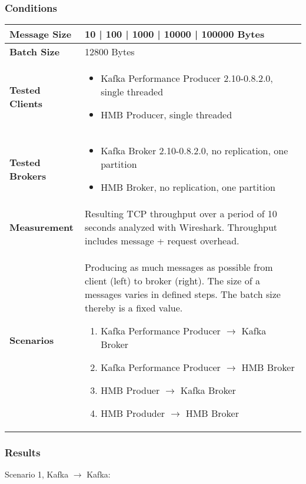 \subsubsection{Conditions}
\begin{table}[H]
\begin{tabular}{|l| p{11.5cm}|} \hline
{\bf Message Size}   & 10 | 100 | 1000 | 10000 | 100000 Bytes \\ \hline
{\bf Batch Size}     & 12800 Bytes \\ \hline
{\bf Tested Clients} &
    \begin{itemize}
        \item Kafka Performance Producer 2.10-0.8.2.0, single threaded
        \item HMB Producer, single threaded
    \end{itemize}\\ \hline
{\bf Tested Brokers} &
    \begin{itemize}
        \item Kafka Broker 2.10-0.8.2.0, no replication, one partition
        \item HMB Broker, no replication, one partition
    \end{itemize}\\ \hline
{\bf Measurement} & Resulting TCP throughput over a period of 10 seconds analyzed with
    Wireshark. Throughput includes message + request overhead.\\ \hline
{\bf Scenarios} & Producing as much messages as possible from client (left) to broker (right).
    The size of a messages varies in defined steps. The batch size thereby is a fixed value. 
  \begin{enumerate}
        \item Kafka Performance Producer $\rightarrow$ Kafka Broker
        \item Kafka Performance Producer $\rightarrow$ HMB Broker
        \item HMB Produer $\rightarrow$ Kafka Broker
        \item HMB Produder $\rightarrow$ HMB Broker
    \end{enumerate} \\ \hline
\end{tabular}
\end{table}

\newpage
\subsubsection{Results}
Scenario 1, Kafka $\rightarrow$ Kafka:

